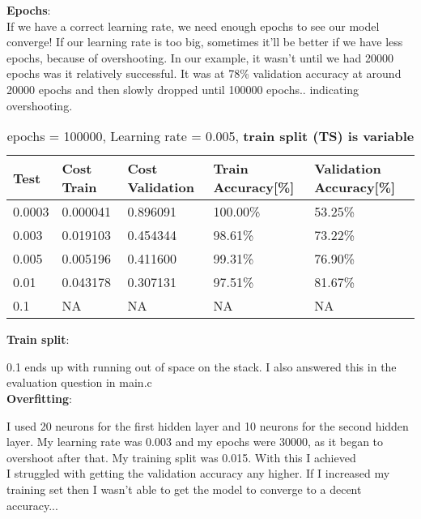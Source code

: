 \documentclass{report}
\begin{document}
\textbf{Epochs}: \\

If we have a correct learning rate, we need enough epochs to see our model converge! If our learning rate is too big, sometimes it'll be better if we have less epochs, because of overshooting. In our example, it wasn't until we had 20000 epochs was it relatively successful. It was at 78\% validation accuracy at around 20000 epochs and then slowly dropped until 100000 epochs.. indicating overshooting.

\newpage

\begin{table}[h!]
\centering
\caption{epochs = 100000, Learning rate = 0.005, \textbf{train split (TS) is variable}}
\vspace{10pt}  %
\begin{tabularx}{\textwidth}{@{} X X X X X @{}}
\hline
{Test} & {Cost Train} & {Cost Validation} & {Train Accuracy[\%]} & {Validation Accuracy[\%]} \\
\hline
0.0003 & 0.000041 & 0.896091 & 100.00\% & 53.25\% \\
\hline
0.003 & 0.019103 & 0.454344 & 98.61\% & 73.22\% \\
\hline
0.005 & 0.005196 & 0.411600 & 99.31\% & 76.90\% \\
\hline
0.01 & 0.043178 & 0.307131 & 97.51\% & 81.67\% \\
\hline
0.1 & NA & NA & NA & NA \\
\hline
\end{tabularx}
\end{table}



\textbf{Train split}:

0.1 ends up with running out of space on the stack. I also answered this in the evaluation question in main.c\\


\textbf{Overfitting}:

I used 20 neurons for the first hidden layer and 10 neurons for the second hidden layer. My learning rate was 0.003 and my epochs were 30000, as it began to overshoot after that. My training split was 0.015. With this I achieved \\

I struggled with getting the validation accuracy any higher. If I increased my training set then I wasn't able to get the model to converge to a decent accuracy...\\
\end{document}
